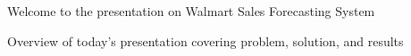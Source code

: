 
\STANDARD{}
{
  \titlepage
}

\MYNOTE
{
  Welcome to the presentation on Walmart Sales Forecasting System
}

\STANDARD{}
{
\tableofcontents[hideallsubsections]
}

\MYNOTE
{
  Overview of today's presentation covering problem, solution, and results
}

